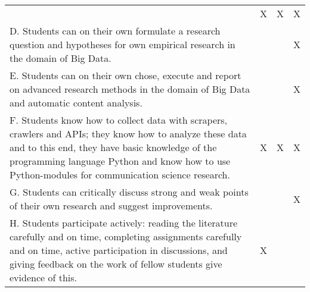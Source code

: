 \documentclass[a4paper,12pt]{report}
\begin{document}
\begin{table}[]
{\begin{tabular}{p{8cm}p{2cm}p{2cm}p{2cm}}
                                                                & X                                                                                            & X                       & X                        \\
D. Students can on their own formulate a research question and hypotheses for own empirical research in the domain of Big Data.                                                                                                                                                                                                     &                                                                                              &                         & X                        \\
E. Students can on their own chose, execute and report on advanced research methods in the domain of Big Data and automatic content analysis.                                                                                                                                                                                             &                                                                                              &                         & X                        \\
F. Students know how to collect data with scrapers, crawlers and APIs; they know how to analyze these data and to this end, they have basic knowledge of the programming language Python and know how to use Python-modules for communication science research.                                                                         & X                                                                                            & X                       & X                        \\
G. Students can critically discuss  strong and weak points of their own research and suggest improvements.                                                                                                                                                                                                                                         &                                                                                              &                         & X                        \\
H. Students participate actively: reading the literature carefully and on time, completing assignments carefully and on time, active participation in discussions, and giving feedback on the work of fellow students give evidence of this.                                                                                                                                      & X                                                                                            &                         &                         
\end{tabular}
}
\end{table}
\end{document}
